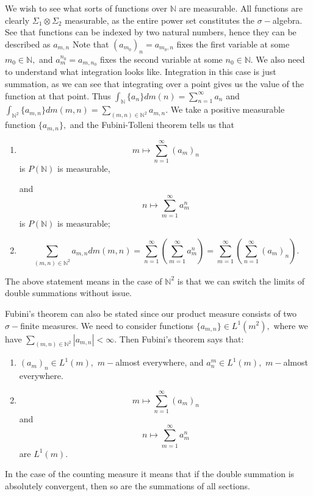 \documentclass{article}
\begin{document}
We wish to see what sorts of functions over $\mathbb{N}$ are measurable. All functions are clearly $\Sigma_1 \otimes \Sigma_2$ measurable, as the entire power set constitutes the $\sigma-$algebra. See that functions can be indexed by two natural numbers, hence they can be described as $a_{m,n}$ Note that $(a_{m_0})_{n}=a_{m_0,n}$ fixes the first variable at some $m_0 \in \mathbb{N},$ and $a^{n_0}_m=a_{m,n_0}$ fixes the second variable at some $n_0 \in \mathbb{N}.$  
We also need to understand what integration looks like. Integration in this case is just summation, as we can see that integrating over a point gives us the value of the function at that point. Thus $\int_{\mathbb{N}}\{a_n\} dm(n)=\sum_{n=1}^{\infty}a_n $ and $ \int_{\mathbb{N}^2}\{a_{m,n}\} dm(m,n)=\sum_{(m,n) \in \mathbb{N}^2} a_{m,n}.$
We take a positive measurable function $\{a_{m,n}\},$ and the Fubini-Tolleni theorem tells us that 
\begin{enumerate}
	\item $$m \mapsto \sum_{n=1}^{\infty} (a_m)_{n} $$ is $P(\mathbb{N})$ is measurable, 
	
	and $$n \mapsto \sum_{m=1}^{\infty}a^{n}_m $$ is $P(\mathbb{N})$ is measurable;
	\item $$\sum_{(m,n) \in \mathbb{N}^2}a_{m,n}dm(m,n) = \sum_{n=1}^{\infty} \left( \sum_{m=1}^{\infty}a^{n}_m \right)= \sum_{m=1}^{\infty} \left( \sum_{n=1}^{\infty}(a_m)_{n} \right).$$
\end{enumerate}

The above statement means in the case of $\mathbb{N}^2$ is that we can switch the limits of double summations without issue. 

Fubini's theorem can also be stated since our product measure consists of two $\sigma-$finite measures. We need to consider functions $\{a_{m,n}\} \in L^1(m^2),$ where we have $\sum_{(m,n) \in \mathbb{N}^2} |a_{m,n}|< \infty.$ Then Fubini's theorem says that: 
\begin{enumerate}
	\item $(a_m)_n \in L^1(m),$ $m-$almost everywhere, and $a^m_n \in L^1(m),$ $m-$almost everywhere.
	\item $$m \mapsto \sum_{n=1}^{\infty} (a_m)_{n}$$ and $$ n \mapsto \sum_{m=1}^{\infty}a^{n}_m$$ are $L^1(m)$.  
\end{enumerate}
In the case of the counting measure it means that if the double summation is absolutely convergent, then so are the summations of all sections.

 
\end{document}
